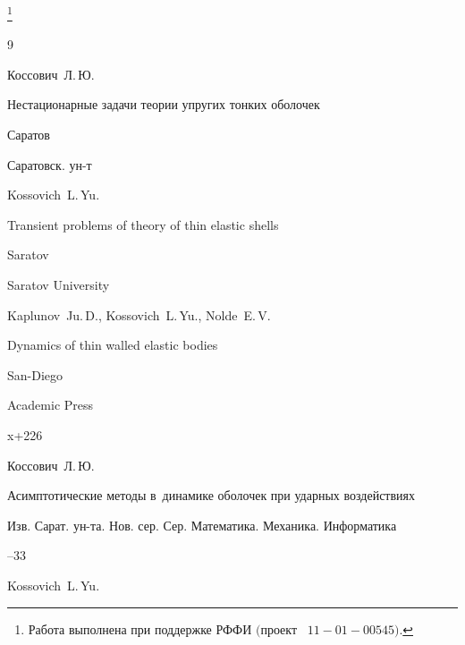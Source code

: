 \thanks{Работа выполнена при поддержке РФФИ $($проект \rm \No~$11{-}01{-}00545).$}





\begin{thebibliography}{9}




\by Коссович~Л.\,Ю.

\book Нестационарные задачи теории упругих тонких оболочек

\publaddr Саратов

\publ Саратовск. ун-т



\misctransl

\by Kossovich~L.\,Yu.

\book Transient problems of theory of thin elastic shells

\publaddr Saratov

\publ Saratov University






\by Kaplunov~Ju.\,D., Kossovich~L.\,Yu., Nolde~E.\,V.

\book Dynamics of thin walled elastic bodies

\publaddr San-Diego

\publ Academic Press


\totalpages x+226




\by Коссович~Л.\,Ю.

\paper Асимптотические методы в~динамике оболочек при ударных воздействиях

\jour Изв. Сарат. ун-та. Нов. сер. Сер. Математика. Механика. Информатика




--33


\misctransl

\by Kossovich~L.\,Yu.


\end{thebibliography}
